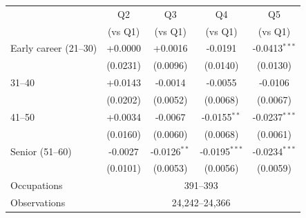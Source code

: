 \begin{tabular}{lcccc}
\toprule
 & Q2 & Q3 & Q4 & Q5 \\
 & (vs Q1) & (vs Q1) & (vs Q1) & (vs Q1) \\
\midrule
Early career (21--30) & +0.0000 & +0.0016 & -0.0191 & -0.0413$^{***}$ \\
 & (0.0231) & (0.0096) & (0.0140) & (0.0130) \\
31--40 & +0.0143 & -0.0014 & -0.0055 & -0.0106 \\
 & (0.0202) & (0.0052) & (0.0068) & (0.0067) \\
41--50 & +0.0034 & -0.0067 & -0.0155$^{**}$ & -0.0237$^{***}$ \\
 & (0.0160) & (0.0060) & (0.0068) & (0.0061) \\
Senior (51--60) & -0.0027 & -0.0126$^{**}$ & -0.0195$^{***}$ & -0.0234$^{***}$ \\
 & (0.0101) & (0.0053) & (0.0056) & (0.0059) \\
\midrule
Occupations & \multicolumn{4}{c}{391--393} \\
Observations & \multicolumn{4}{c}{24,242--24,366} \\
\bottomrule
\end{tabular}
